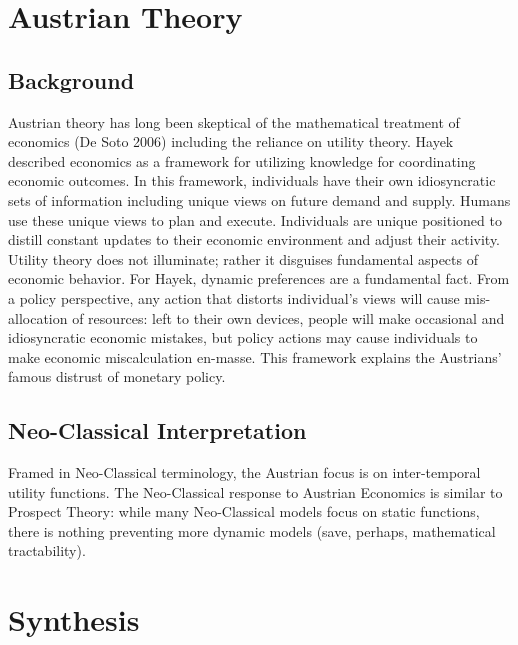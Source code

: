 \documentclass{article}
\begin{document}
\section{Austrian Theory}

\subsection{Background}
Austrian theory has long been skeptical of the mathematical treatment of economics (De Soto 2006) including the reliance on utility theory.  Hayek described economics as a framework for utilizing knowledge for coordinating economic outcomes.  In this framework, individuals have their own idiosyncratic sets of information including unique views on future demand and supply.  Humans use these unique views to plan and execute.  Individuals are unique positioned to distill constant updates to their economic environment and adjust their activity.  Utility theory does not illuminate; rather it disguises fundamental aspects of economic behavior.  For Hayek, dynamic preferences are a fundamental fact.  From a policy perspective, any action that distorts individual's views will cause mis-allocation of resources: left to their own devices, people will make occasional and idiosyncratic economic mistakes, but policy actions may cause individuals to make economic miscalculation en-masse.  This framework explains the Austrians' famous distrust of monetary policy.  

\subsection{Neo-Classical Interpretation}

Framed in Neo-Classical terminology, the Austrian focus is on inter-temporal utility functions.  The Neo-Classical response to Austrian Economics is similar to Prospect Theory: while many Neo-Classical models focus on static functions, there is nothing preventing more dynamic models (save, perhaps, mathematical tractability).  


\section{Synthesis} \label{research}
\end{document}
